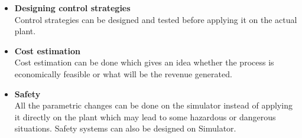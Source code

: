 \documentclass[12pt]{report}
\begin{document}
\begin{itemize}
\item{\textbf{Designing control strategies}} \\
Control strategies can be designed and tested before applying it on the actual plant.

\item{\textbf{Cost estimation}} \\
Cost estimation can be done which gives an idea whether the process is economically feasible or what will be the revenue generated.

\item{\textbf{Safety}} \\
All the parametric changes can be done on the simulator instead of applying it directly on the plant which may lead to some hazardous or dangerous situations. Safety systems can also be designed on Simulator.
\end{itemize}
\end{document}
